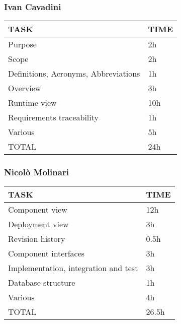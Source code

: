 \hfill
\subsubsection{Ivan Cavadini}
\hfill
\begin{center}
	\begin{tabular}{ | l | p{6cm} | } 
		\hline
		TASK & TIME \\ 
		\hline
		Purpose & 2h  \\ 
		\hline
		Scope & 2h  \\ 
		\hline
		Definitions, Acronyms, Abbreviations & 1h \\ 
		\hline
		Overview & 3h \\ 
		\hline
		Runtime view & 10h \\ 
		\hline
		Requirements traceability & 1h \\ 
		\hline
		Various & 5h  \\ 
		\hline
		TOTAL & 24h \\ 
		\hline
	\end{tabular}
\end{center}
\hfill
\newpage
\subsubsection{Nicolò Molinari}
\hfill
\begin{center}
	\begin{tabular}{ | l | p{6cm} | } 
		\hline
		TASK & TIME \\ 
		\hline
		Component view & 12h  \\ 
		\hline
		Deployment view & 3h  \\ 
		\hline
		Revision history & 0.5h \\ 
		\hline
		Component interfaces & 3h \\ 
		\hline
		Implementation, integration and test & 3h \\ 
		\hline
		Database structure & 1h   \\ 
		\hline
		Various & 4h \\ 
		\hline
		TOTAL & 26.5h \\ 
		\hline
	\end{tabular}
\end{center}
\hfill
\newpage
